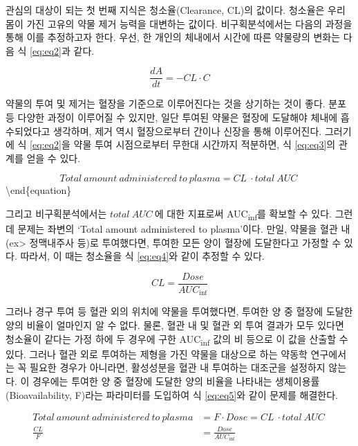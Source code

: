 \documentclass[
  11pt,
  krantz2, a4paper, twoside]{krantz}
\theoremstyle{definition}
\theoremstyle{definition}
\theoremstyle{definition}
\theoremstyle{definition}
\theoremstyle{remark}
\begin{document}
관심의 대상이 되는 첫 번째 지식은 청소율(Clearance, CL)의 값이다.
청소율은 우리 몸이 가진 고유의 약물 제거 능력을 대변하는 값이다.
비구획분석에서는 다음의 과정을 통해 이를 추정하고자 한다. 우선, 한
개인의 체내에서 시간에 따른 약물량의 변화는 다음 식 \eqref{eq:eq2}과 같다.

\begin{equation}
\frac{dA}{dt} = -CL \cdot C
\label{eq:eq2}
\end{equation}

약물의 투여 및 제거는 혈장을 기준으로 이루어진다는 것을 상기하는 것이 좋다.
분포 등 다양한 과정이 이루어질 수 있지만, 일단 투여된 약물은 혈장에 도달해야 체내에 흡수되었다고 생각하며, 제거 역시 혈장으로부터 간이나 신장을 통해 이루어진다.
그러기에 식 \eqref{eq:eq2}을 약물 투여 시점으로부터 무한대 시간까지 적분하면, 식 \eqref{eq:eq3}의 관계를 얻을 수 있다.

\begin{equation}
Total\ amount\ administered\ to\ plasma = CL\  \cdot total\ AUC\
\label{eq:eq3}
\end{equation}\textbackslash end\{equation\}

그리고 비구획분석에서는 \({total~AUC~}\)에 대한 지표로써 AUC\textsubscript{inf}를 확보할 수 있다. 그런데 문제는 좌변의 `Total amount administered to plasma'이다. 만일, 약물을 혈관 내(ex\textgreater{} 정맥내주사 등)로 투여했다면, 투여한 모든 양이 혈장에 도달한다고 가정할 수 있다. 따라서, 이 때는 청소율을 식 \eqref{eq:eq4}와 같이 추정할 수 있다.

\begin{equation}
CL = \frac{{Dose}}{{AUC}_{\inf}}
\label{eq:eq4}
\end{equation}

그러나 경구 투여 등 혈관 외의 위치에 약물을 투여했다면, 투여한 양 중 혈장에 도달한 양의 비율이 얼마인지 알 수 없다. 물론, 혈관 내 및 혈관 외 투여 결과가 모두 있다면 청소율이 같다는 가정 하에 두 경우에 구한 AUC\textsubscript{inf} 값의 비 등으로 이 값을 산출할 수 있다. 그러나 혈관 외로 투여하는 제형을 가진 약물을 대상으로 하는 약동학 연구에서는 꼭 필요한 경우가 아니라면, 활성성분을 혈관 내 투여하는 대조군을 설정하지 않는다. 이 경우에는 투여한 양 중 혈장에 도달한 양의 비율을 나타내는 생체이용률(Bioavailability, F)라는 파라미터를 도입하여 식 \eqref{eq:eq5}와 같이 문제를 해결한다.

\begin{equation}
\begin{split}
Total\ amount\ administered\ to\ plasma &= F \cdot Dose = CL\  \cdot total\ AUC\ \\
\frac{{CL}}{F} &= \frac{{Dose}}{{AUC}_{\inf}}
\end{split}
\label{eq:eq5}
\end{equation}
\end{document}
